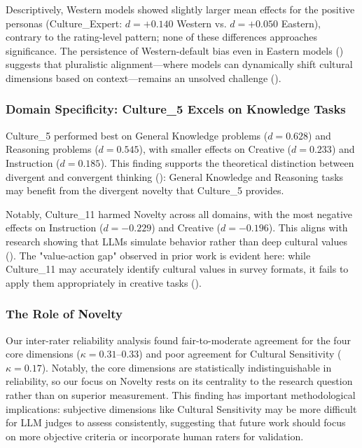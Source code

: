 \documentclass{article}
\begin{document}
Descriptively, Western models showed slightly larger mean effects for the positive personas (Culture\_Expert: \(d = +0.140\) Western vs. \(d = +0.050\) Eastern), contrary to the rating-level pattern; none of these differences approaches significance. The persistence of Western-default bias even in Eastern models (\cite{bolei_ma_78d40201}) suggests that pluralistic alignment—where models can dynamically shift cultural dimensions based on context—remains an unsolved challenge (\cite{kharchenkoHowWellLLMs2024}).

\subsubsection{Domain Specificity: Culture\_5 Excels on Knowledge Tasks}

Culture\_5 performed best on General Knowledge problems (\(d = 0.628\)) and Reasoning problems (\(d = 0.545\)), with smaller effects on Creative (\(d = 0.233\)) and Instruction (\(d = 0.185\)). This finding supports the theoretical distinction between divergent and convergent thinking (\cite{vikram_arora_67282d96, harsh_kumar_84fce084}): General Knowledge and Reasoning tasks may benefit from the divergent novelty that Culture\_5 provides.

Notably, Culture\_11 harmed Novelty across all domains, with the most negative effects on Instruction (\(d = -0.229\)) and Creative (\(d = -0.196\)). This aligns with research showing that LLMs simulate behavior rather than deep cultural values (\cite{kharchenkoHowWellLLMs2024}). The "value-action gap" observed in prior work is evident here: while Culture\_11 may accurately identify cultural values in survey formats, it fails to apply them appropriately in creative tasks (\cite{bolei_ma_78d40201}).

\subsubsection{The Role of Novelty}

Our inter-rater reliability analysis found fair-to-moderate agreement for the four core dimensions (\(\kappa = 0.31\)--\(0.33\)) and poor agreement for Cultural Sensitivity (\(\kappa = 0.17\)). Notably, the core dimensions are statistically indistinguishable in reliability, so our focus on Novelty rests on its centrality to the research question rather than on superior measurement. This finding has important methodological implications: subjective dimensions like Cultural Sensitivity may be more difficult for LLM judges to assess consistently, suggesting that future work should focus on more objective criteria or incorporate human raters for validation.
\end{document}
